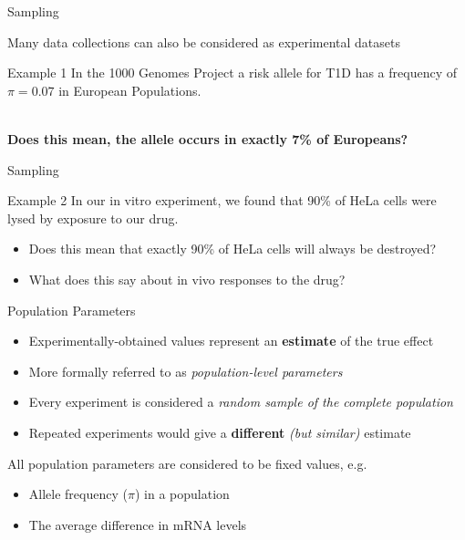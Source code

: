 \documentclass[aspectratio=169,11pt]{beamer}
\begin{document}
\begin{frame}{Sampling}

	Many data collections can also be considered as experimental datasets
	
	\begin{block}{Example 1}
	In the 1000 Genomes Project a risk allele for T1D has a frequency of $\pi = 0.07$ in European Populations.
	\end{block}
	
	~\\
	\textbf{Does this mean, the allele occurs in exactly 7\% of Europeans?}

\end{frame}

\begin{frame}{Sampling}

	\begin{block}{Example 2}
	In our in vitro experiment, we found that 90\% of HeLa cells were lysed by exposure to our drug.
	\end{block}
	
		\begin{itemize}
			\item Does this mean that exactly 90\% of HeLa cells will always be destroyed?
			\item What does this say about in vivo responses to the drug?
		\end{itemize}

\end{frame}

\begin{frame}{Population Parameters}

	\begin{itemize}
		\item Experimentally-obtained values represent an \textbf{estimate} of the true effect
		\item More formally referred to as \textit{population-level parameters}
		\item Every experiment is considered a \textit{random sample of the complete population}
		\item Repeated experiments would give a \textbf{different} \textit{(but similar)} estimate
	\end{itemize}
	
\pause	
	
	All population parameters are considered to be fixed values, e.g.

	\begin{itemize}
		\item Allele frequency ($\pi$) in a population
		\item The average difference in mRNA levels
	\end{itemize}		


\end{frame}
\end{document}
